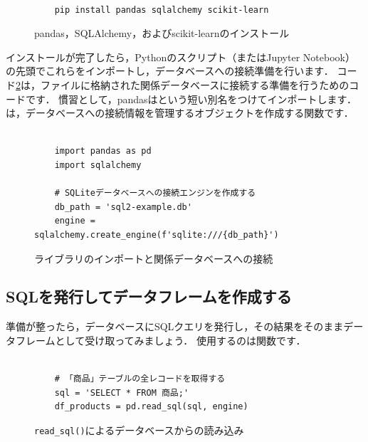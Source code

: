 \begin{figure}[!htbp]
    \begin{verbatim}

    pip install pandas sqlalchemy scikit-learn

    \end{verbatim}
    \captionsetup{name=コード}
    \caption{pandas，SQLAlchemy，およびscikit-learnのインストール}
    \label{code:pandas-install}
\end{figure}

インストールが完了したら，Pythonのスクリプト（またはJupyter Notebook）の先頭でこれらをインポートし，データベースへの接続準備を行います．
コード\ref{code:pandas-import}は，ファイルに格納された関係データベースに接続する準備を行うためのコードです．
慣習として，pandasはという短い別名をつけてインポートします．
は，データベースへの接続情報を管理するオブジェクトを作成する関数です．

\begin{figure}[!htbp]
    \begin{verbatim}

    import pandas as pd
    import sqlalchemy

    # SQLiteデータベースへの接続エンジンを作成する
    db_path = 'sql2-example.db'
    engine = sqlalchemy.create_engine(f'sqlite:///{db_path}')

    \end{verbatim}
    \captionsetup{name=コード}
    \caption{ライブラリのインポートと関係データベースへの接続}
    \label{code:pandas-import}
\end{figure}

\subsection{SQLを発行してデータフレームを作成する}\label{sec:pandas-read-sql}
準備が整ったら，データベースにSQLクエリを発行し，その結果をそのままデータフレームとして受け取ってみましょう．
使用するのは関数です．

\begin{figure}[!htbp]
    \begin{verbatim}

    # 「商品」テーブルの全レコードを取得する
    sql = 'SELECT * FROM 商品;'
    df_products = pd.read_sql(sql, engine)

    \end{verbatim}
    \captionsetup{name=コード}
    \caption{\texttt{read\_sql()}によるデータベースからの読み込み}
    \label{code:pandas-read-sql}
\end{figure}

